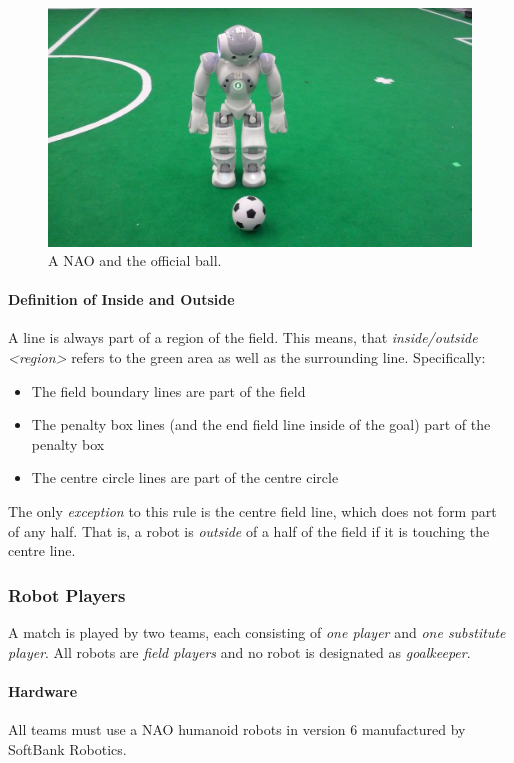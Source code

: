 \begin{figure}[t]
	\centerline{\includegraphics[height=0.28\columnwidth]{figs/robotWithBall2016.jpg}}
	\caption{A NAO and the official ball.}
	\label{fig:ball}
\end{figure}


\paragraph{Definition of Inside and Outside}
\label{sec:inside_outside}

A line is always part of a region of the field.
This means, that \emph{inside/outside \textless region\textgreater} refers to the green area as well as the surrounding line.
Specifically:
\begin{itemize}
	\item The field boundary lines are part of the field
	\item The penalty box lines (and the end field line inside of the goal) part of the penalty box
	\item The centre circle lines are part of the centre circle
\end{itemize}

The only \textit{exception} to this rule is the centre field line, which does not form part of any half.
That is, a robot is \textit{outside} of a half of the field if it is touching the centre line.

\newpage


\subsubsection{Robot Players}
\label{sec:robot_players}
A match is played by two teams, each consisting of \emph{one player} and \emph{one substitute player}. All robots are \emph{field players} and no robot is designated as \emph{goalkeeper}.

\paragraph{Hardware}
\label{sec:hardware}
All teams must use a NAO humanoid robots in version 6 manufactured by SoftBank Robotics.

